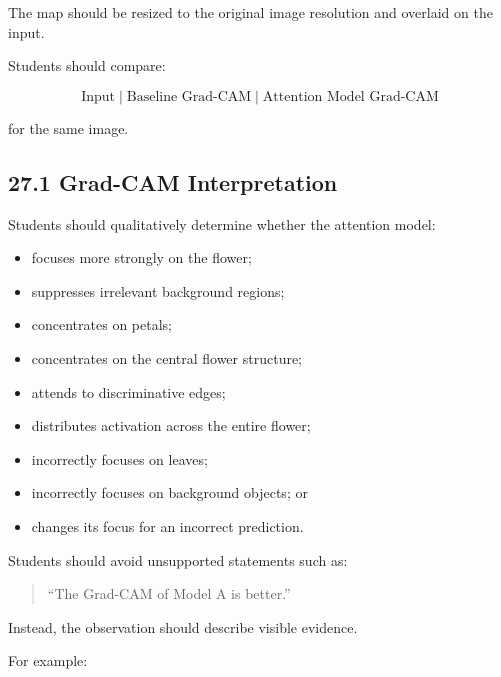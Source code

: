 \documentclass[10pt]{article}
\begin{document}
The map should be resized to the original image resolution and overlaid on
the input.

Students should compare:

\[
\boxed{
\text{Input}
\;|\;
\text{Baseline Grad-CAM}
\;|\;
\text{Attention Model Grad-CAM}
}
\]

for the same image.

\subsection*{27.1 Grad-CAM Interpretation}

Students should qualitatively determine whether the attention model:

\begin{itemize}

\item focuses more strongly on the flower;

\item suppresses irrelevant background regions;

\item concentrates on petals;

\item concentrates on the central flower structure;

\item attends to discriminative edges;

\item distributes activation across the entire flower;

\item incorrectly focuses on leaves;

\item incorrectly focuses on background objects; or

\item changes its focus for an incorrect prediction.

\end{itemize}

Students should avoid unsupported statements such as:

\begin{quote}
``The Grad-CAM of Model A is better.''
\end{quote}

Instead, the observation should describe visible evidence.

For example:
\end{document}
